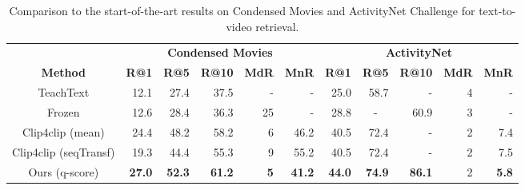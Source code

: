  \begin{table}[t]
\centering
\scriptsize
\setlength{\tabcolsep}{3pt}
\caption{\small{Comparison to the start-of-the-art results on Condensed Movies and ActivityNet Challenge for text-to-video retrieval.}}
\begin{tabular}{@{}crrrrr|rrrrr@{}}
\toprule
                      & \multicolumn{5}{c|}{\textbf{Condensed Movies}}                                                                                                                                 & \multicolumn{5}{c}{\textbf{ActivityNet}}                                                                                                                                      \\
\textbf{Method}       & \multicolumn{1}{c}{\textbf{R@1}} & \multicolumn{1}{c}{\textbf{R@5}} & \multicolumn{1}{c}{\textbf{R@10}} & \multicolumn{1}{c}{\textbf{MdR}} & \multicolumn{1}{c|}{\textbf{MnR}} & \multicolumn{1}{c}{\textbf{R@1}} & \multicolumn{1}{c}{\textbf{R@5}} & \multicolumn{1}{c}{\textbf{R@10}} & \multicolumn{1}{c}{\textbf{MdR}} & \multicolumn{1}{c}{\textbf{MnR}} \\ \midrule
TeachText             & 12.1                             & 27.4                             & 37.5                              & -       & -                                 & 25.0                             & 58.7                             & -                                 & 4                              & -                                \\
Frozen                &  12.6                                &   28.4                               &  36.3                       &  25                      &   -   & 28.8                    & \multicolumn{1}{c}{-}   & 60.9                              & 3                              & -                                \\
Clip4clip (mean)      & 24.4                             & 48.2                             & 58.2                              & 6                              & 46.2                              & 40.5                             & 72.4                             & -                                 & 2                              & 7.4                              \\
Clip4clip (seqTransf) & 19.3                             & 44.4                             & 55.3                              & 9                              & 55.2                              & 40.5                             & 72.4                             & -                                 & 2                              & 7.5                              \\ \midrule
Ours (q-score)        & \textbf{27.0}                    & \textbf{52.3}                    & \textbf{61.2}                     & \textbf{5}                     & \textbf{41.2}                     & \textbf{44.0}                    & \textbf{74.9}                    & \textbf{86.1}                     & 2                              & \textbf{5.8}                     \\ \bottomrule
\end{tabular}
\label{tab:cmd-sota}
\end{table} 
